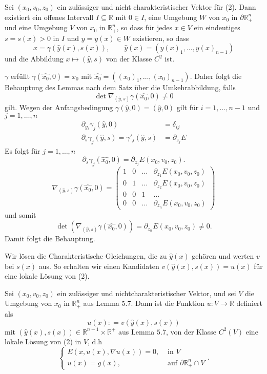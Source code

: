 \begin{lemma}
	Sei $(x_0,v_0,z_0)$ ein zulässiger und nicht charakteristischer Vektor für (2). Dann existiert ein offenes Intervall $I \subseteq \mathbb{R}$ mit $0 \in I$, eine Umgebung $W$ von $x_0$ in $\partial \mathbb{R}^n_+$ und eine Umgebung $V$ von $x_0$ in $\mathbb{R}^n_+$, so dass für jedes $x \in V$ ein eindeutiges $s = s(x) >0$ in $I$ und $y = y(x) \in W$ existieren, so dass
	\[
		x = \gamma(\hat{y}(x),s(x)), \qquad \hat{y}(x) = (y(x)_1, \dots, y(x)_{n-1})
	\]
und die Abbildung $x \mapsto (\hat{y},s)$ von der Klasse $C^2$ ist.
\end{lemma}
\begin{beweis}
	$\gamma$ erfüllt $\gamma(\hat{x_0},0)= x_0$ mit $\hat{x_0}= ((x_0)_1, \dots , (x_0)_{n-1})$. Daher folgt die Behauptung des Lemmas nach dem Satz über die Umkehrabbildung, falls
	\[
		\det  \nabla _{(\hat{y},s)} \gamma(\hat{x_0},0) \neq 0
	\]
	gilt. Wegen der Anfangsbedingung $\gamma(\hat{y},0)= (\hat{y},0)$ gilt für $i=1,\dots,n-1$ und $j=1,\dots,n$
	\begin{align*}
		\partial_{y_i} \gamma_j ( \hat{y}, 0 ) &= \delta _{ij} \\
		\partial_s \gamma_j(\hat{y},s) = \gamma'_j(\hat{y},s) &= \partial_{z_j}E
	\end{align*}
	Es folgt für $j=1,\dots,n$
	\[
		\partial_s \gamma_j (\hat{x_0},0) = \partial_{z_j} E(x_0,v_0,z_0).
	\]
	\[
		 \nabla _{(\hat{y},s)} \gamma ( \hat{x_0},0) = \begin{pmatrix}
		 	1 & 0 & \dots & \partial_{z_1}E(x_0,v_0,z_0) \\
			0 & 1 & \dots & \partial_{z_2}E(x_0,v_0,z_0) \\
			0 & 0 & 1 & \dots \\
			0 & 0 & \dots & \partial_{z_n}E(x_0,v_0,z_0)
		 \end{pmatrix}
	\]
	und somit 
	\[
		\det (  \nabla_{(\hat{y},s)} \gamma(\hat{x_0},0)) = \partial_{z_n} E(x_0,v_0,z_0) \neq 0.
	\]
	Damit folgt die Behauptung. 
\end{beweis}

Wir lösen die Charakteristische Gleichungen, die zu $\hat{y}(x)$ gehören und werten $v$ bei $s(x)$ aus. So erhalten wir einen Kandidaten $v(\hat{y}(x),s(x)) = u(x)$ 
für eine lokale Lösung von (2).

\begin{satz}
	Sei $(x_0,v_0,z_0)$ ein zulässiger und nichtcharakteristischer Vektor, und sei $V$ die Umgebung von $x_0$ in $\mathbb{R}^n_+$ aus Lemma $5.7$. Dann ist die Funktion $u: V \to \mathbb{R}$ definiert als 
	\[
		u(x) : = v( \hat{y}(x), s(x))
	\]
	mit $(\hat{y}(x),s(x)) \in \mathbb{R}^{n-1} \times \mathbb{R}^+$ aus Lemma $5.7$, von der Klasse $C^2(V)$ eine lokale Lösung von (2) in $V$, d.h
	\[
		\begin{cases}
			E(x,u(x), \nabla u(x)) = 0 , &\text{ in }V\\
			u(x) = g(x), & \text{ auf } \partial \mathbb{R}^n_+ \cap V
			
		\end{cases}.
	\]
\end{satz}

